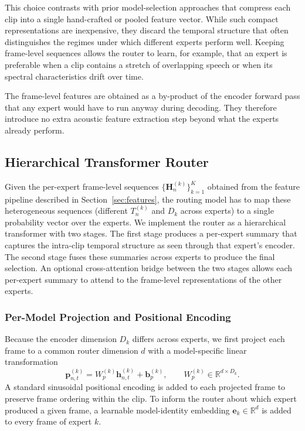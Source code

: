 \documentclass[journal]{IEEEtran}
\begin{document}
This choice contrasts with prior model-selection approaches that
compress each clip into a single hand-crafted or pooled feature
vector. While such compact representations are inexpensive, they
discard the temporal structure that often distinguishes the regimes
under which different experts perform well. Keeping frame-level
sequences allows the router to learn, for example, that an expert is
preferable when a clip contains a stretch of overlapping speech or
when its spectral characteristics drift over time.

The frame-level features are obtained as a by-product of the encoder
forward pass that any expert would have to run anyway during
decoding. They therefore introduce no extra acoustic feature
extraction step beyond what the experts already perform.

\subsection{Hierarchical Transformer Router}
\label{subsec:transformer_router}

Given the per-expert frame-level sequences
$\{\mathbf{H}_n^{(k)}\}_{k=1}^{K}$ obtained from the feature pipeline
described in Section~\ref{sec:features}, the routing model has to map
these heterogeneous sequences (different $T_n^{(k)}$ and $D_k$ across
experts) to a single probability vector over the experts. We
implement the router as a hierarchical transformer with two stages.
The first stage produces a per-expert summary that captures the
intra-clip temporal structure as seen through that expert's encoder.
The second stage fuses these summaries across experts to produce the
final selection. An optional cross-attention bridge between the two
stages allows each per-expert summary to attend to the frame-level
representations of the other experts.

\subsubsection{Per-Model Projection and Positional Encoding}

Because the encoder dimension $D_k$ differs across experts, we first
project each frame to a common router dimension $d$ with a
model-specific linear transformation
\begin{equation}
\mathbf{p}_{n,t}^{(k)} = W_p^{(k)} \mathbf{h}_{n,t}^{(k)} + \mathbf{b}_p^{(k)},
\qquad W_p^{(k)} \in \mathbb{R}^{d\times D_k}.
\label{eq:projection}
\end{equation}
A standard sinusoidal positional encoding \cite{vaswani2017attention}
is added to each projected frame to preserve frame ordering within
the clip. To inform the router about which expert produced a given
frame, a learnable model-identity embedding $\mathbf{e}_k\in\mathbb{R}^{d}$
is added to every frame of expert $k$.
\end{document}
